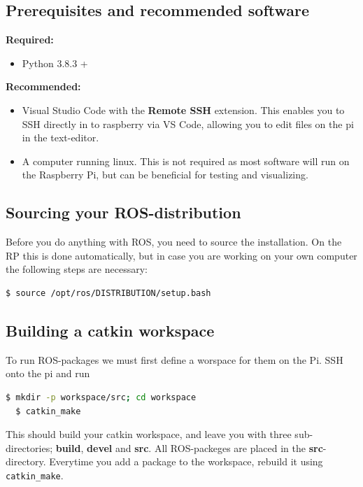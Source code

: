 \subsection{Prerequisites and recommended software}

\textbf{Required:}
\begin{itemize}
    \item Python 3.8.3 +
\end{itemize}
\textbf{Recommended:}
\begin{itemize}
    \item Visual Studio Code with the \textbf{Remote SSH} extension. This enables you to SSH directly in to raspberry via VS Code, allowing you to edit files on the pi in the text-editor.
    \item A computer running linux. This is not required as most software will run on the Raspberry Pi, but can be beneficial for testing and visualizing.
\end{itemize}
\subsection{Sourcing your ROS-distribution}

Before you do anything with ROS, you need to source the installation. On the RP this is done automatically, but in case you are working on your own computer the following steps are necessary: 

\begin{lstlisting}[language=bash,basicstyle=\mlttfamily, breaklines=true]
  $ source /opt/ros/DISTRIBUTION/setup.bash
\end{lstlisting}

\subsection{Building a catkin workspace}

To run ROS-packages we must first define a worspace for them on the Pi. SSH onto the pi and run 

\begin{lstlisting}[language=bash,basicstyle=\mlttfamily, breaklines=true]
  $ mkdir -p workspace/src; cd workspace
  $ catkin_make
\end{lstlisting}

This should build your catkin workspace, and leave you with three sub-directories; \textbf{build}, \textbf{devel} and \textbf{src}. All ROS-packeges are placed in the \textbf{src}-directory. Everytime you add a package to the workspace, rebuild it using \lstinline{catkin_make}.

